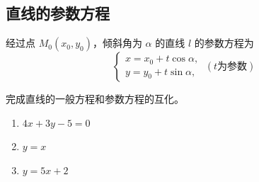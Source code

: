 \subsection{直线的参数方程}
\begin{theorem}[直线的参数方程]
经过点 \( M_0(x_0, y_0) \)，倾斜角为 \( \alpha \) 的直线 \( l \) 的参数方程为
\[\left\{
\begin{gathered}
    x = x_0 + t \cos \alpha, \\
    y = y_0 + t \sin \alpha,
\end{gathered}\right.
\ (t\text{为参数})
\]
\end{theorem}
\begin{corollary}
    
\end{corollary}
\begin{example}
    完成直线的一般方程和参数方程的互化。
    
    \begin{enumerate}
        \item \(4x+3y-5=0\)
        \item \(y=x\)
        \item \(y=5x+2\)
    \end{enumerate}
\end{example}
\clearpage

